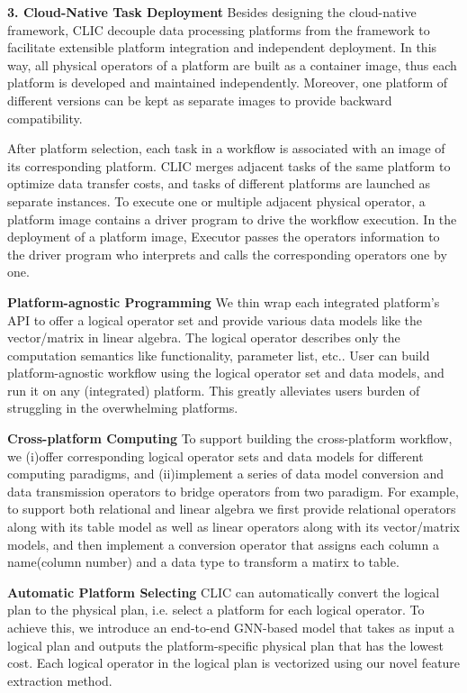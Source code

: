 \textbf{3. Cloud-Native Task Deployment} Besides designing the cloud-native framework, CLIC decouple data processing platforms from the framework to facilitate extensible platform integration and independent deployment.
In this way, all physical operators of a platform are built as a container image, thus each platform is developed and maintained independently.
Moreover, one platform of different versions can be kept as separate images to provide backward compatibility.

After platform selection, each task in a workflow is associated with an image of its corresponding platform.
CLIC merges adjacent tasks of the same platform to optimize data transfer costs, and tasks of different platforms are launched as separate instances.
To execute one or multiple adjacent physical operator, a platform image contains a driver program to drive the workflow execution. In the deployment of a platform image, Executor passes the operators information to the driver program who interprets and calls the corresponding operators one by one.






\iffalse
\textbf{Platform-agnostic Programming}   We thin wrap each integrated platform's API to offer a logical operator set and provide various data models like the vector/matrix in linear algebra. The logical operator describes only the computation semantics like functionality, parameter list, etc.. User can build platform-agnostic workflow using the logical operator set and data models, and run it on any (integrated) platform. This greatly alleviates users burden of struggling in the overwhelming platforms.

\textbf{Cross-platform Computing}     To support building the cross-platform workflow, we (i)offer corresponding logical operator sets and data models for different computing paradigms, and (ii)implement a series of data model conversion and data transmission operators to bridge operators from two paradigm. For example, to support both relational and linear algebra we first provide relational operators along with its table model as well as linear operators along with its vector/matrix models, and then implement a conversion operator that assigns each column a name(column number) and a data type to transform a matirx to table.

\textbf{Automatic Platform Selecting}     CLIC can automatically convert the logical plan to the physical plan, i.e. select a platform for each logical operator. To achieve this, we introduce an end-to-end GNN-based model that takes as input a logical plan and outputs the platform-specific physical plan that has the lowest cost. Each logical operator in the logical plan is vectorized using our novel feature extraction method.

